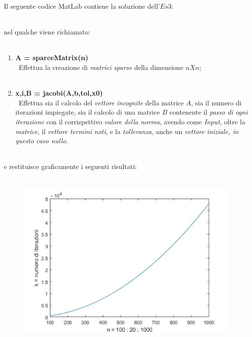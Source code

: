 Il seguente codice MatLab contiene la soluzione dell'$Es 3$:\\\
	
nel qualche viene richiamato:\\\
	\begin{enumerate}
		\item \textbf{A = sparceMatrix(n)}\\\
			Effettua la creazione di \textit{matrici sparse} della dimensione $nXn$;\\\
		\item \textbf{x,i,B = jacobi(A,b,tol,x0)}\\\
			Effettua sia il calcolo del \textit{vettore incognite} della matrice $A$, sia il numero di iterazioni impiegate, sia il calcolo di una matrice $B$ contenente il \textit{passo di ogni iterazione} con il corrispettivo \textit{valore della norma}, avendo come \textit{Input}, oltre la 	\textit{matrice}, il \textit{vettore termini noti}, e la \textit{tolleranza}, anche un \textit{vettore iniziale, in questo caso nullo}.\\\
			
	\end{enumerate}
e restituisce graficamente i seguenti risultati:\\\
	\begin{figure}[H]
		\includegraphics[width=\textwidth]{Plot/Cap_6_Es_3}
	\end{figure}